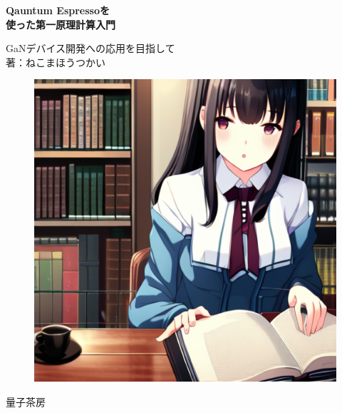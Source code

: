 \documentclass[ %
  uplatex,%
  a5paper,%
  papersize%
]{jsbook}
\makeatletter
\def\vhrulefill#1{\leavevmode\leaders\hrule\@height#1\hfill \kern\z@}
\makeatother
\begin{document}
\begin{titlepage} %
  \pagecolor{titlepagecolor}

	\raggedright %

    \color{titlecolor}
		{
    {\Huge \bfseries Qauntum Espressoを\\
    使った第一原理計算入門}\\}%
    \color{green}{\vhrulefill{5pt}}

    \color{titlecolor}
    {
    {\Large GaNデバイス開発への応用を目指して}\\[3\baselineskip] %
    {\Large \textsc{著：ねこまほうつかい}} %
    }

    \begin{figure}[h]
      \begin{center}
        \includegraphics[scale=0.5]{./sumnail/sumnail_01.png}
      \end{center}
    \end{figure}

		{\Large 量子茶房}\\[\baselineskip]%

\end{titlepage}
\pagecolor{white}
\frontmatter

\tableofcontents %

\mainmatter








\backmatter
\printindex
\end{document}
